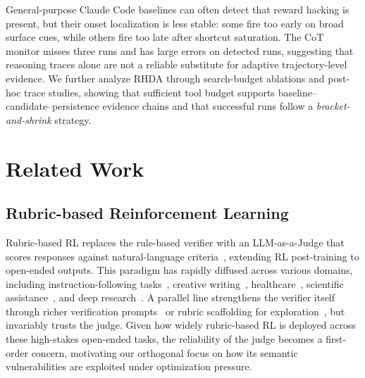 \documentclass[11pt]{article}
\begin{document}
General-purpose Claude Code baselines can often detect that reward hacking is present, but their onset localization is less stable: some fire too early on broad surface cues, while others fire too late after shortcut saturation. The CoT monitor misses three runs and has large errors on detected runs, suggesting that reasoning traces alone are not a reliable substitute for adaptive trajectory-level evidence. We further analyze RHDA through search-budget ablations and post-hoc trace studies, showing that sufficient tool budget supports baseline--candidate--persistence evidence chains and that successful runs follow a \emph{bracket-and-shrink} strategy.


\section{Related Work}

\subsection{Rubric-based Reinforcement Learning}


Rubric-based RL replaces the rule-based verifier with an LLM-as-a-Judge that scores responses against natural-language criteria~\citep{gunjalRubricsRewardsReinforcement2025, yeSelfRewardingRubricBasedReinforcement2025, huangReinforcementLearningRubric2025, jia2026autorubricrubricbasedgenerativerewards}, extending RL post-training to open-ended outputs. This paradigm has rapidly diffused across various domains, including instruction-following tasks~\citep{heAdvancedIFRubricBasedBenchmarking2025, pengVerIFVerificationEngineering2025, guoIFDECORATORWrappingInstruction2025, xu2026rubricstokensbridgingresponselevel}, creative writing~\citep{liaoRLMRReinforcementLearning2025, jiaWritingZeroBridgeGap2025, liu2026r2writereflectionrevisionopenended}, healthcare~\citep{aroraHealthBenchEvaluatingLarge2025, wang2025infimedorbitaligningllmsopenended, yang2026healthscorescalablerubricsimproving, dent2026healthcraftreinforcementlearningsafety}, scientific assistance~\citep{goelTrainingAICoScientists2025, panigrahi2026heurekabenchbenchmarkingframeworkai, oneill2025sparkssciencehypothesisgeneration}, and deep research~\citep{shaoDRTuluReinforcement2025, lv2026learningqueryspecificrubricshuman, ma2025efficientrubricbasedgenerativeverifier}. A parallel line strengthens the verifier itself through richer verification prompts~\citep{pengVerIFVerificationEngineering2025, guoIFDECORATORWrappingInstruction2025} or rubric scaffolding for exploration~\citep{zhouRubricScaffoldedReinforcement2025}, but invariably trusts the judge. Given how widely rubric-based RL is deployed across these high-stakes open-ended tasks, the reliability of the judge becomes a first-order concern, motivating our orthogonal focus on how its semantic vulnerabilities are exploited under optimization pressure.
\end{document}
